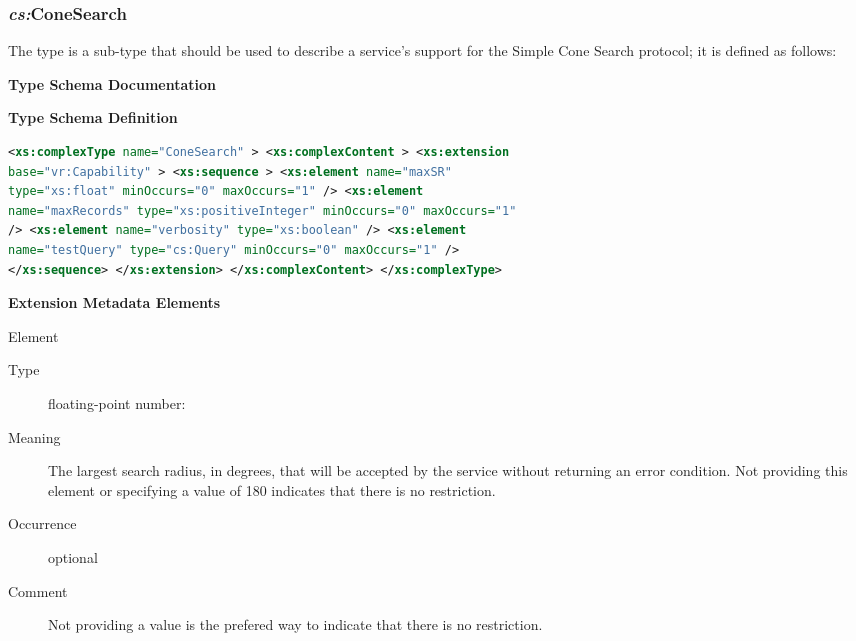 \documentclass[11pt,a4paper]{ivoa} 
\begin{document}
\subsubsection{\textit{cs:}ConeSearch} \label{subsec:cstype} The
 type is a  sub-type that
should be used to describe a service's support for the Simple Cone
Search protocol; it is defined as follows:

\begin{generated} \begingroup \renewcommand*{}\vspace{2ex}\noindent\textbf{
Type Schema Documentation}


\vspace{1ex}\noindent\textbf{ Type Schema
Definition}

\begin{lstlisting}[language=XML,basicstyle=\footnotesize]
<xs:complexType name="ConeSearch" > <xs:complexContent > <xs:extension
base="vr:Capability" > <xs:sequence > <xs:element name="maxSR"
type="xs:float" minOccurs="0" maxOccurs="1" /> <xs:element
name="maxRecords" type="xs:positiveInteger" minOccurs="0" maxOccurs="1"
/> <xs:element name="verbosity" type="xs:boolean" /> <xs:element
name="testQuery" type="cs:Query" minOccurs="0" maxOccurs="1" />
</xs:sequence> </xs:extension> </xs:complexContent> </xs:complexType>
\end{lstlisting}

\vspace{0.5ex}\noindent\textbf{ Extension Metadata
Elements}

\begingroup\small\begin{bigdescription}\item[Element \xmlel{maxSR}]
\begin{description} \item[Type] floating-point number: 
\item[Meaning] The largest search radius, in degrees, that will be
accepted by the service without returning an error condition.  Not
providing this element or specifying a value of 180 indicates that there
is no restriction.
                     
\item[Occurrence] optional \item[Comment] Not providing a value is the
prefered way to indicate that there is no restriction. 
                     


\end{description}
\end{bigdescription}
\end{generated}
\end{document}

